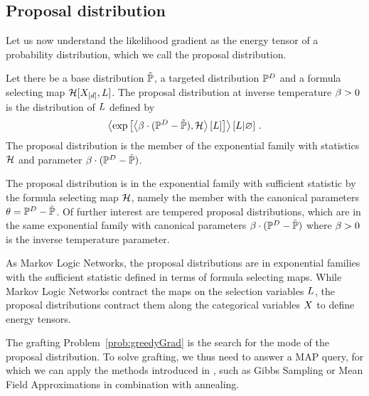 \subsection{Proposal distribution}


Let us now understand the likelihood gradient as the energy tensor of a probability distribution, which we call the proposal distribution.

\begin{definition}
	Let there be a base distribution $\tilde{\mathbb{P}}$, a targeted distribution $\mathbb{P}^{D}$ and a formula selecting map $\mathcal{H}[X_{[d]}, L]$.
	The proposal distribution at inverse temperature $\beta>0$ is the distribution of $L$ defined by
	\begin{align*}
		\left\langle \mathrm{exp}\left[\left\langle \beta\cdot(\mathbb{P}^{D}-\tilde{\mathbb{P}}),\mathcal{H}\right\rangle \left[ L \right]\right] \right\rangle \left[ L | \varnothing \right] \, . 
	\end{align*}
	The proposal distribution is the member of the exponential family with statistics $\mathcal{H}$ and parameter $\beta\cdot(\mathbb{P}^{D}-\tilde{\mathbb{P}})$.
\end{definition}


The proposal distribution is in the exponential family with sufficient statistic by the formula selecting map $\mathcal{H}$, namely the member with the canonical parameters $\theta=\mathbb{P}^{D}-\tilde{\mathbb{P}}$.
Of further interest are tempered proposal distributions, which are in the same exponential family with canonical parameters $\beta\cdot(\mathbb{P}^{D}-\tilde{\mathbb{P}})$ where $\beta>0$ is the inverse temperature parameter.

As Markov Logic Networks, the proposal distributions are in exponential families with the sufficient statistic defined in terms of formula selecting maps.
While Markov Logic Networks contract the maps on the selection variables $L$, the proposal distributions contract them along the categorical variables $X$ to define energy tensors.

The grafting Problem~\eqref{prob:greedyGrad} is the search for the mode of the proposal distribution.
To solve grafting, we thus need to answer a MAP query, for which we can apply the methods introduced in , such as Gibbs Sampling or Mean Field Approximations in combination with annealing.


